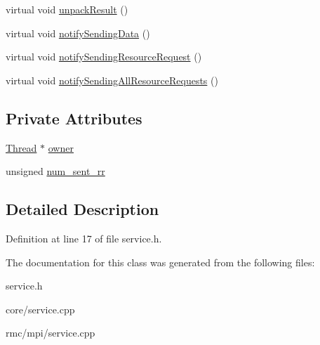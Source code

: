\begin{CompactItemize}
\item 
\hypertarget{classService_45c06344edbfa482b91f68e2035a6099}{
virtual void \hyperlink{classService_45c06344edbfa482b91f68e2035a6099}{unpack\-Result} ()}
\label{classService_45c06344edbfa482b91f68e2035a6099}

\item 
\hypertarget{classService_81ad4d6ebb50045b8977e2ab74826f30}{
virtual void \hyperlink{classService_81ad4d6ebb50045b8977e2ab74826f30}{notify\-Sending\-Data} ()}
\label{classService_81ad4d6ebb50045b8977e2ab74826f30}

\item 
\hypertarget{classService_94e2012e76aaae3aa8199250f558d503}{
virtual void \hyperlink{classService_94e2012e76aaae3aa8199250f558d503}{notify\-Sending\-Resource\-Request} ()}
\label{classService_94e2012e76aaae3aa8199250f558d503}

\item 
\hypertarget{classService_f94cc8a5c2665d4574041737e61e9ffc}{
virtual void \hyperlink{classService_f94cc8a5c2665d4574041737e61e9ffc}{notify\-Sending\-All\-Resource\-Requests} ()}
\label{classService_f94cc8a5c2665d4574041737e61e9ffc}

\end{CompactItemize}
\subsection*{Private Attributes}
\begin{CompactItemize}
\item 
\hypertarget{classService_8b615c65c876f342fe8209eb7e36d7b2}{
\hyperlink{classThread}{Thread} $\ast$ \hyperlink{classService_8b615c65c876f342fe8209eb7e36d7b2}{owner}}
\label{classService_8b615c65c876f342fe8209eb7e36d7b2}

\item 
\hypertarget{classService_a5b2ad9520bb3710b54348b99acebd58}{
unsigned \hyperlink{classService_a5b2ad9520bb3710b54348b99acebd58}{num\_\-sent\_\-rr}}
\label{classService_a5b2ad9520bb3710b54348b99acebd58}

\end{CompactItemize}


\subsection{Detailed Description}




Definition at line 17 of file service.h.

The documentation for this class was generated from the following files:\begin{CompactItemize}
\item 
service.h\item 
core/service.cpp\item 
rmc/mpi/service.cpp\end{CompactItemize}
